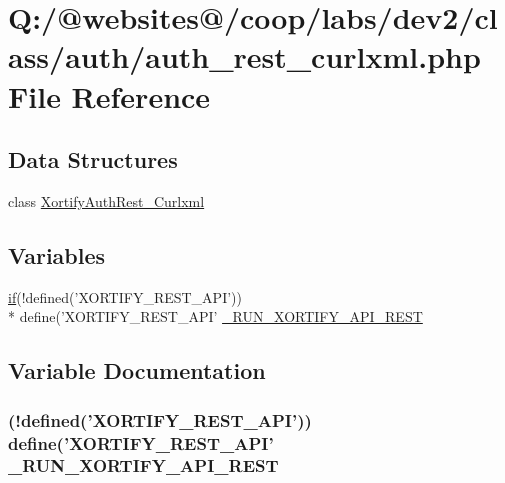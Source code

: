 \hypertarget{auth__rest__curlxml_8php}{\section{Q\-:/@websites@/coop/labs/dev2/class/auth/auth\-\_\-rest\-\_\-curlxml.php File Reference}
\label{auth__rest__curlxml_8php}
}
\subsection*{Data Structures}
\begin{DoxyCompactItemize}
\item 
class \hyperlink{class_xortify_auth_rest___curlxml}{Xortify\-Auth\-Rest\-\_\-\-Curlxml}
\end{DoxyCompactItemize}
\subsection*{Variables}
\begin{DoxyCompactItemize}
\item 
\hyperlink{index_8php_ae2ccdf355624402b65fc2226f2a661cd}{if}(!defined('X\-O\-R\-T\-I\-F\-Y\-\_\-\-R\-E\-S\-T\-\_\-\-A\-P\-I')) \\*
define('X\-O\-R\-T\-I\-F\-Y\-\_\-\-R\-E\-S\-T\-\_\-\-A\-P\-I' \hyperlink{auth__rest__curlxml_8php_a731f04083e48e3087b2f5cad38672473}{\-\_\-\-R\-U\-N\-\_\-\-X\-O\-R\-T\-I\-F\-Y\-\_\-\-A\-P\-I\-\_\-\-R\-E\-S\-T}
\end{DoxyCompactItemize}


\subsection{Variable Documentation}
\hypertarget{auth__rest__curlxml_8php_a731f04083e48e3087b2f5cad38672473}{
\subsubsection[{\-\_\-\-R\-U\-N\-\_\-\-X\-O\-R\-T\-I\-F\-Y\-\_\-\-A\-P\-I\-\_\-\-R\-E\-S\-T}]{ (!defined('X\-O\-R\-T\-I\-F\-Y\-\_\-\-R\-E\-S\-T\-\_\-\-A\-P\-I')) define('X\-O\-R\-T\-I\-F\-Y\-\_\-\-R\-E\-S\-T\-\_\-\-A\-P\-I' \-\_\-\-R\-U\-N\-\_\-\-X\-O\-R\-T\-I\-F\-Y\-\_\-\-A\-P\-I\-\_\-\-R\-E\-S\-T}}\label{auth__rest__curlxml_8php_a731f04083e48e3087b2f5cad38672473}

